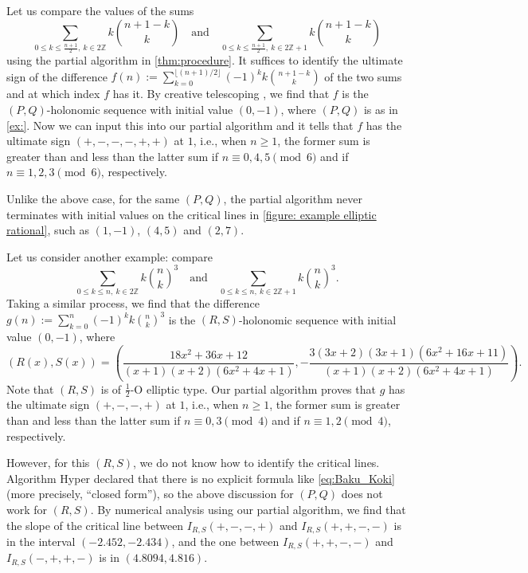 \documentclass[a4paper,UKenglish,cleveref,autoref,thm-restate]{lipics-v2021}
\newcommand{\Z}{\mathbb{Z}}
\begin{document}
\begin{example}
Let us compare the values of the sums 
\[
\sum_{0 \leq k \leq \frac{n+1}2 , \ k \in 2\Z} k \binom{n+1-k}{k} 
\quad \text{and} \quad 
\sum_{0 \leq k \leq \frac{n+1}2 , \ k \in 2\Z+1} k \binom{n+1-k}{k}
\]
using the partial algorithm in \cref{thm:procedure}. It suffices to identify the ultimate sign of the difference $f(n) := \sum_{k=0}^{\lfloor (n+1)/2\rfloor} (-1)^k k \binom{n+1-k}{k}$ of the two sums and at which index $f$ has it. By creative telescoping \cite[Chapter 6]{PWZ96}, we find that $f$ is the $(P, Q)$-holonomic sequence with initial value $(0, -1)$, where $(P, Q)$ is as in \cref{ex:}. Now we can input this into our partial algorithm and it tells that $f$ has the ultimate sign $(+, -, -, -, +, +)$ at $1$, i.e., when $n \geq 1$, the former sum is greater than and less than the latter sum if $n \equiv 0, 4, 5 \pmod{6}$ and if $n \equiv 1, 2, 3 \pmod{6}$, respectively. 

Unlike the above case, for the same $(P, Q)$, the partial algorithm never terminates with initial values on the critical lines in \cref{figure: example elliptic rational}, such as $(1, -1)$, $(4, 5)$ and $(2, 7)$. 


Let us consider another example: compare 
\[
\sum_{0 \leq k \leq n , \ k \in 2\Z} k \binom{n}{k}^3
\quad \text{and} \quad 
\sum_{0 \leq k \leq n , \ k \in 2\Z+1} k \binom{n}{k}^3. 
\]
Taking a similar process, we find that the difference $g(n) := \sum_{k=0}^n (-1)^k k \binom{n}{k}^3$ is the $(R, S)$-holonomic sequence with initial value $(0, -1)$, where
\[
(R(x), S(x)) = \left( \frac{18x^2 + 36 x + 12}{(x+1)(x+2)(6x^2+4x+1)}, -\frac{3(3x+2)(3x+1)(6x^2+16x+11)}{(x+1)(x+2)(6x^2+4x+1)} \right). 
\]
Note that $(R, S)$ is of $\frac12$-O elliptic type. Our partial algorithm proves that $g$ has the ultimate sign $(+, -, -, +)$ at $1$, i.e., when $n \geq 1$, the former sum is greater than and less than the latter sum if $n \equiv 0, 3 \pmod{4}$ and if $n \equiv 1, 2 \pmod{4}$, respectively. 

However, for this $(R, S)$, we do not know how to identify the critical lines. 
Algorithm Hyper \cite[Chapter 8]{PWZ96} declared that there is no explicit formula like \eqref{eq:Baku_Koki} (more precisely, ``closed form''), so the above discussion for $(P, Q)$ does not work for $(R, S)$. 
By numerical analysis using our partial algorithm, we find that the slope of the critical line between $I_{R, S}(+, -, -, +)$ and $I_{R, S}(+, +, -, -)$ is in the interval $(-2.452, -2.434)$, and the one between $I_{R, S}(+, +, -, -)$ and $I_{R, S}(-, +, +, -)$ is in $(4.8094, 4.816)$. 
\end{example}
\end{document}
